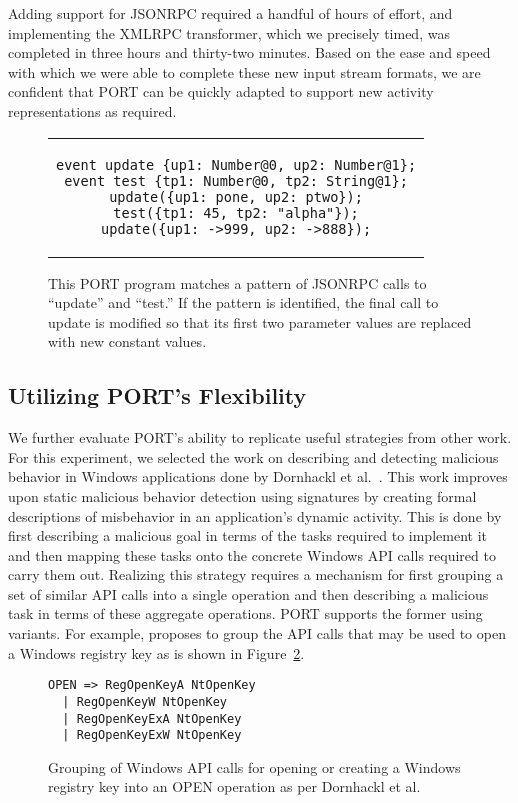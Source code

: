 Adding support for JSONRPC required a handful of hours of effort, and implementing the XMLRPC transformer,
which we precisely timed, was completed in three
hours and thirty-two minutes.  Based on the ease and speed with which we
were able to complete these new input stream formats, we are confident that PORT can be
quickly adapted to support new activity representations as required.

\begin{figure}[H]
\centering
\begin{tabular}{c}
\begin{lstlisting}
event update {up1: Number@0, up2: Number@1};
event test {tp1: Number@0, tp2: String@1};
update({up1: pone, up2: ptwo});
test({tp1: 45, tp2: "alpha"});
update({up1: ->999, up2: ->888});
\end{lstlisting}
\end{tabular}
\caption{This PORT program matches a pattern of JSONRPC calls to
  ``update'' and ``test.''  If the pattern is identified, the final call to
  update is modified so that its first two parameter values are replaced
  with new constant values.}
\label{lst:JSONProgram}
\end{figure}


\subsection{Utilizing PORT's Flexibility}
We further evaluate PORT's ability to replicate useful strategies
from other work.
For this experiment, we selected the work on
describing and detecting malicious behavior in Windows
applications done by Dornhackl et al.~\cite{Dornhackl2014}.  This work
improves upon static malicious behavior detection using signatures by
creating formal descriptions of misbehavior in an application's
dynamic activity.  This is done by first describing a malicious goal
in terms of the tasks required to implement it and then
mapping these tasks onto
the concrete Windows API calls required to carry them out.
Realizing this strategy
requires a mechanism for first grouping a set of similar API calls
into a single operation and then describing a malicious task in terms of
these aggregate operations.  PORT supports the former using variants.
For example, \cite{Dornhackl2014} proposes to group the API calls that may be used to
open a Windows registry key as is shown in Figure~\ref{lst:DornhacklOpen}.

\begin{figure}
\begin{lstlisting}
OPEN => RegOpenKeyA NtOpenKey
  | RegOpenKeyW NtOpenKey
  | RegOpenKeyExA NtOpenKey
  | RegOpenKeyExW NtOpenKey
\end{lstlisting}
\caption{Grouping of Windows API calls for opening or creating a Windows
  registry key into an OPEN operation as per Dornhackl et al.}
\label{lst:DornhacklOpen}
\end{figure}

